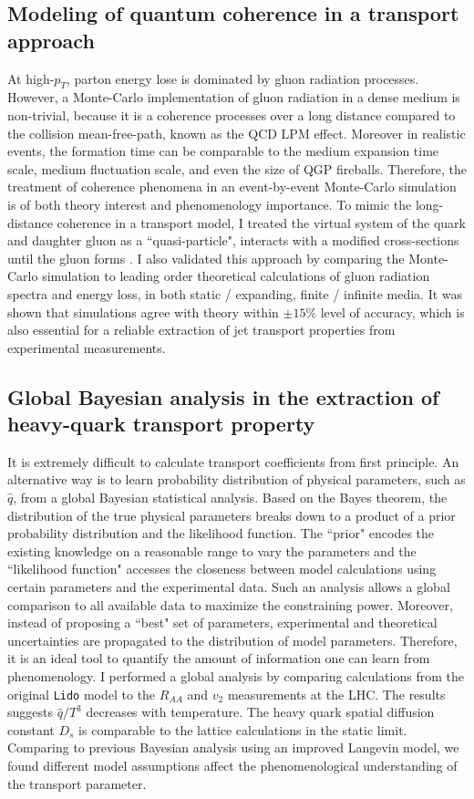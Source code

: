\documentclass[12pt,a4paper]{revtex4-1}
\begin{document}
\subsection*{Modeling of quantum coherence in a transport approach}
At high-$p_T$, parton energy lose is dominated by gluon radiation processes. 
However, a Monte-Carlo implementation of gluon radiation in a dense medium is non-trivial, because it is a coherence processes over a long distance  compared to the collision mean-free-path, known as the QCD LPM effect. 
Moreover in realistic events, the formation time can be comparable to the medium expansion time scale, medium fluctuation scale, and even the size of QGP fireballs. 
Therefore, the treatment of coherence phenomena in an event-by-event Monte-Carlo simulation is of both theory interest and phenomenology importance.
To mimic the long-distance coherence in a transport model, I treated the virtual system of the quark and daughter gluon as a ``quasi-particle", interacts with a modified cross-sections until the gluon forms \cite{Ke:2018jem}. 
I also validated this approach by comparing the Monte-Carlo simulation to leading order theoretical calculations of gluon radiation spectra and energy loss, in both static / expanding, finite / infinite media. 
It was shown that simulations agree with theory within $\pm 15\%$ level of accuracy, which is also essential for a reliable extraction of jet transport properties from experimental measurements.

\subsection*{Global Bayesian analysis in the extraction of heavy-quark transport property}
It is extremely difficult to calculate transport coefficients from first principle. 
An alternative way is to learn probability distribution of physical parameters, such as $\hat{q}$, from a global Bayesian statistical analysis.
Based on the Bayes theorem, the distribution of the true physical parameters breaks down to a product of a prior probability distribution and the likelihood function.
The ``prior" encodes the existing knowledge on a reasonable range to vary the parameters and the ``likelihood function" accesses the closeness between model calculations using certain parameters and the experimental data.
Such an analysis allows a global comparison to all available data to maximize the constraining power.
Moreover, instead of proposing a ``best" set of parameters, experimental and theoretical uncertainties are propagated to the distribution of model parameters.
Therefore, it is an ideal tool to quantify the amount of information one can learn from phenomenology.
I performed a global analysis by comparing calculations from the original {\tt Lido} model to the $R_{AA}$ and $v_{2}$ measurements at the LHC. 
The results suggests $\hat{q}/T^3$ decreases with temperature.
The heavy quark spatial diffusion constant $D_s$ is comparable to the lattice calculations in the static limit.
Comparing to previous Bayesian analysis using an improved Langevin model, we found different model assumptions affect the phenomenological understanding of the transport parameter.




\end{document}

